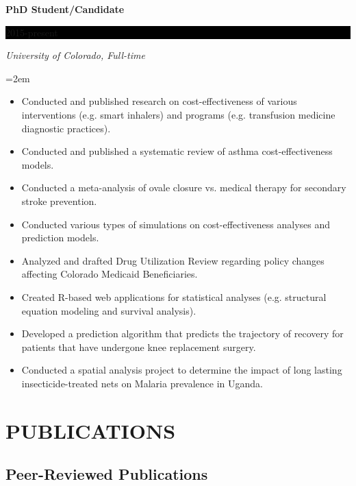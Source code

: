 \documentclass[paper=a4,fontsize=11pt]{scrartcl} %
\newcommand{\sepspace}{\vspace*{1em}}		%
\newcommand{\NewPart}[1]{\section*{\uppercase{#1}}}
\newcommand{\EducationEntry}[4]{
		\noindent \textbf{#1} \hfill      %
		\colorbox{Black}{%
			\parbox{6em}{%
			\hfill\color{White}#2}} \par  %
		\noindent \textit{#3} \par        %
		\noindent\hangindent=2em\hangafter=0 \small #4 %
		\normalsize \par}
\begin{document}
\EducationEntry{PhD Student/Candidate}{2015-present}{University of Colorado, Full-time}{}
\begin{itemize}
    \setlength\itemsep{0em}
    \item Conducted and published research on cost-effectiveness of various interventions (e.g. smart inhalers) and programs (e.g. transfusion medicine diagnostic practices).
    \item Conducted and published a systematic review of asthma cost-effectiveness models.
    \item Conducted a meta-analysis of ovale closure vs. medical therapy for secondary stroke prevention.
    \item Conducted various types of simulations on cost-effectiveness analyses and prediction models.
    \item Analyzed and drafted Drug Utilization Review regarding policy changes affecting Colorado Medicaid Beneficiaries.
    \item Created R-based web applications for statistical analyses (e.g. structural equation modeling and survival analysis).
    \item Developed a prediction algorithm that predicts the trajectory of recovery for patients that have undergone knee replacement surgery. 
    \item Conducted a spatial analysis project to determine the impact of long lasting insecticide-treated nets on Malaria prevalence in Uganda.
\end{itemize}
\sepspace

\NewPart{Publications}{}
\subsection*{Peer-Reviewed Publications}

\begingroup
\renewcommand{\section}[2]{}%


\nocite{*}
\endgroup
\end{document}
